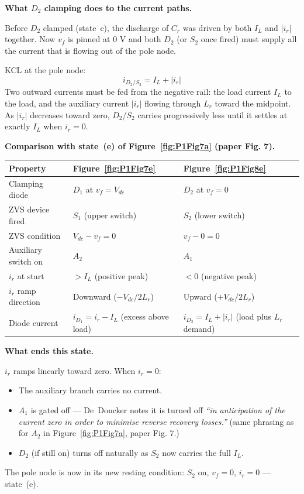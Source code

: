 \documentclass[12pt, a4paper]{article}
\def\,{ }%
\newcommand{\Vdc}{V_{dc}}
\newcommand{\vf}{v_f}
\newcommand{\ir}{i_r}
\newcommand{\IL}{I_L}
\newcommand{\Lr}{L_r}
\newcommand{\figref}[1]{Figure~\ref{#1}}
\begin{document}
\medskip
\textbf{What $D_2$ clamping does to the current paths.}

Before $D_2$ clamped (state~c), the discharge of $C_r$ was driven
by both $\IL$ and $|\ir|$ together.
Now $\vf$ is pinned at 0\,V and both $D_2$ (or $S_2$ once fired)
must supply all the current that is flowing out of the pole node.

KCL at the pole node:
\begin{equation}
    i_{D_2/S_2} = \IL + |\ir|
    \label{eq:stateD8_kcl}
\end{equation}
Two outward currents must be fed from the negative rail: the load
current $\IL$ to the load, and the auxiliary current $|\ir|$ flowing
through $\Lr$ toward the midpoint.
As $|\ir|$ decreases toward zero, $D_2$/$S_2$ carries progressively
less until it settles at exactly $\IL$ when $\ir = 0$.

\medskip
\textbf{Comparison with state~(e) of \figref{fig:P1Fig7a}
(paper Fig.\,7).}

\begin{center}
\renewcommand{\arraystretch}{1.3}
\begin{tabular}{p{3.5cm} p{4.7cm} p{4.7cm}}
\toprule
\textbf{Property} & \textbf{\figref{fig:P1Fig7e}} & \textbf{\figref{fig:P1Fig8e}} \\
\midrule
Clamping diode        & $D_1$ at $\vf = \Vdc$ & $D_2$ at $\vf = 0$ \\
ZVS device fired      & $S_1$ (upper switch)   & $S_2$ (lower switch) \\
ZVS condition         & $\Vdc - \vf = 0$       & $\vf - 0 = 0$ \\
Auxiliary switch on   & $A_2$                  & $A_1$ \\
$\ir$ at start        & $> \IL$ (positive peak) & $< 0$ (negative peak) \\
$\ir$ ramp direction  & Downward ($-\Vdc/2\Lr$) & Upward ($+\Vdc/2\Lr$) \\
Diode current         & $i_{D_1} = \ir - \IL$ (excess above load) &
                        $i_{D_2} = \IL + |\ir|$ (load plus $\Lr$ demand) \\
\bottomrule
\end{tabular}
\end{center}

\medskip
\textbf{What ends this state.}

$\ir$ ramps linearly toward zero.
When $\ir = 0$:
\begin{itemize}
    \item The auxiliary branch carries no current.
    \item $A_1$ is gated off --- De~Doncker notes it is turned off
          \textit{``in anticipation of the current zero in order to
          minimise reverse recovery losses.''} (same phrasing as for
          $A_2$ in \figref{fig:P1Fig7a}, paper Fig.\,7.)
    \item $D_2$ (if still on) turns off naturally as $S_2$ now carries
          the full $\IL$.
\end{itemize}
The pole node is now in its new resting condition: $S_2$ on,
$\vf = 0$, $\ir = 0$ --- state~(e).
\end{document}
